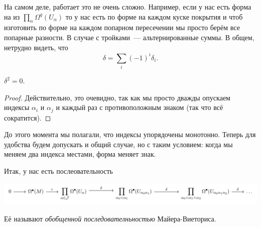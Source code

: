 	  На самом деле, работает это не очень сложно. Например, если у нас есть форма на из $\prod_{\alpha} \Omega^{q}(U_{\alpha})$ то у нас есть по форме на каждом куске покрытия и чтоб изготовить по форме на каждом попарном пересечении мы просто берём все попарные разности. В случае с тройками~--- альтернированные суммы. В общем, нетрудно видеть, что 
	  \[
	  	\delta = \sum_{i} (-1)^i \delta_i.
	  \]

	  \begin{statement} 
	  	$\delta^2 = 0$.
	  \end{statement}
	  \begin{proof}
	  	Действительно, это очевидно, так как мы просто дважды опускаем индексы $\alpha_i $ и $\alpha_j$ и каждый раз с противоположным знаком (так что всё сократится). 
	  \end{proof}

	  \begin{remark}
	 	До этого момента мы полагали, что индексы упорядочены монотонно. Теперь для удобства будем допускать и общий случае, но с таким условием: когда мы меняем два индекса местами, форма меняет знак. 
	 \end{remark}

	 Итак, у нас есть послеовательность 
	 \begin{center}
	 	\includegraphics{lectures/7/pictures/cd_35.pdf}
	 \end{center} 

	 

	 Её называют \emph{обобщенной последователньностью} Майера-Виеториса. 

